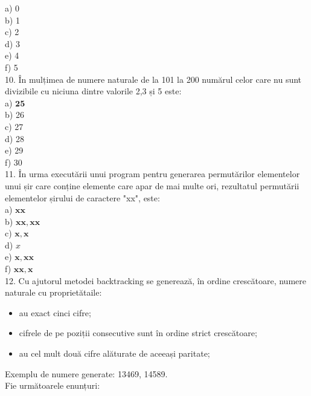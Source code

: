 \documentclass[10pt]{article}
\begin{document}
a) 0\\
b) 1\\
c) 2\\
d) 3\\
e) 4\\
f) 5\\
10. În mulțimea de numere naturale de la 101 la 200 numărul celor care nu sunt divizibile cu niciuna dintre valorile 2,3 și 5 este:\\
a) $\mathbf{2 5}$\\
b) 26\\
c) 27\\
d) 28\\
e) 29\\
f) 30\\
11. În urma executării unui program pentru generarea permutărilor elementelor unui șir care conține elemente care apar de mai multe ori, rezultatul permutării elementelor șirului de caractere "xx", este:\\
a) $\mathbf{x} \mathbf{x}$\\
b) $\mathbf{x x}, \mathbf{x x}$\\
c) $\mathbf{x}, \mathbf{x}$\\
d) $x$\\
e) $\mathbf{x}, \mathbf{x} \mathbf{x}$\\
f) $\mathbf{x x}, \mathbf{x}$\\
12. Cu ajutorul metodei backtracking se generează, în ordine crescătoare, numere naturale cu proprietătaile:

\begin{itemize}
  \item au exact cinci cifre;
  \item cifrele de pe poziții consecutive sunt în ordine strict crescătoare;
  \item au cel mult două cifre alăturate de aceeași paritate;
\end{itemize}

Exemplu de numere generate: 13469, 14589.\\
Fie următoarele enunțuri:
\end{document}
